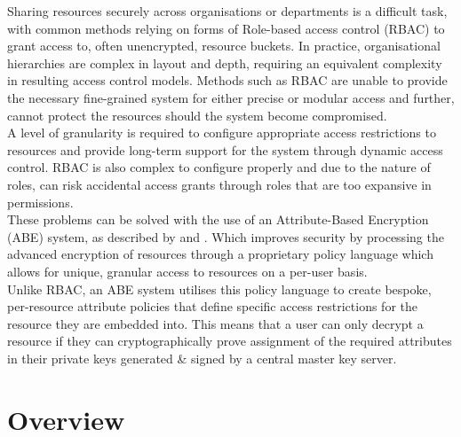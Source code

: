 Sharing resources securely across organisations or departments is a difficult task, with common methods relying on forms of Role-based access control (RBAC) \citep{Sandhu1996} to grant access to, often unencrypted, resource buckets. In practice, organisational hierarchies are complex in layout and depth, requiring an equivalent complexity in resulting access control models. Methods such as RBAC are unable to provide the necessary fine-grained system for either precise or modular access and further, cannot protect the resources should the system become compromised.\\
A level of granularity is required to configure appropriate access restrictions to resources and provide long-term support for the system through dynamic access control. RBAC is also complex to configure properly and due to the nature of roles, can risk accidental access grants through roles that are too expansive in permissions.\\
These problems can be solved with the use of an Attribute-Based Encryption (ABE) system, as described by \citet{Sahai2005} and \citet{Waters2011}. Which improves security by processing the advanced encryption of resources through a proprietary policy language which allows for unique, granular access to resources on a per-user basis.\\
Unlike RBAC, an ABE system utilises this policy language to create bespoke, per-resource attribute policies that define specific access restrictions for the resource they are embedded into. This means that a user can only decrypt a resource if they can cryptographically prove assignment of the required attributes in their private keys \textemdash generated \& signed by a central master key server.

\section{Overview}
\label{sec:intro_overview}

